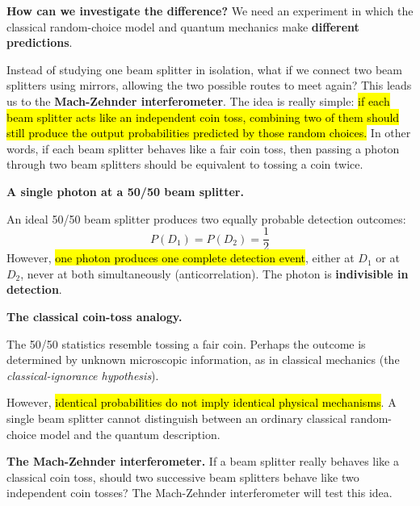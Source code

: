 \highspace
\textcolor{Green3}{ \textbf{How can we investigate the difference?}} We need an experiment in which the classical random-choice model and quantum mechanics make \textbf{different predictions}.

\highspace
Instead of studying one beam splitter in isolation, what if we connect two beam splitters using mirrors, allowing the two possible routes to meet again? This leads us to the \textbf{Mach-Zehnder interferometer}. The idea is really simple: \hl{if each beam splitter acts like an independent coin toss, combining two of them should still produce the output probabilities predicted by those random choices.} In other words, if each beam splitter behaves like a fair coin toss, then passing a photon through two beam splitters should be equivalent to tossing a coin twice.

\highspace

\begin{takeawaysbox}
    \textbf{A single photon at a 50/50 beam splitter.}

    An ideal 50/50 beam splitter produces two equally
    probable detection outcomes:
    \begin{equation*}
        P(D_1)=P(D_2)=\frac{1}{2}
    \end{equation*}
    However, \hl{one photon produces one complete
    detection event}, either at $D_1$ or at $D_2$,
    never at both simultaneously (anticorrelation).
    The photon is \textbf{indivisible in detection}.

    \highspace
    \textbf{The classical coin-toss analogy.}

    The 50/50 statistics resemble tossing a fair coin.
    Perhaps the outcome is determined by unknown
    microscopic information, as in classical mechanics
    (the \emph{classical-ignorance hypothesis}).

    \highspace
    However, \hl{identical probabilities do not imply
    identical physical mechanisms}. A single beam
    splitter cannot distinguish between an ordinary
    classical random-choice model and the quantum
    description.

    \highspace
    \textbf{The Mach-Zehnder interferometer.}
    If a beam splitter really
    behaves like a classical coin toss, should two
    successive beam splitters behave like two independent
    coin tosses? The Mach-Zehnder interferometer will test this idea.
\end{takeawaysbox}

